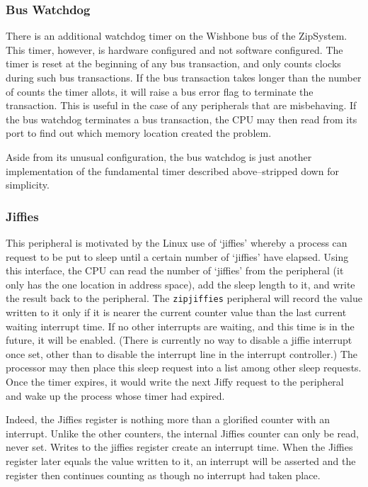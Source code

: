 \documentclass{gqtekspec}
\begin{document}
\subsubsection{Bus Watchdog}
There is an additional watchdog timer on the Wishbone bus of the ZipSystem. 
This timer,
however, is hardware configured and not software configured.  The timer is
reset at the beginning of any bus transaction, and only counts clocks during
such bus transactions.  If the bus transaction takes longer than the number
of counts the timer allots, it will raise a bus error flag to terminate the
transaction.  This is useful in the case of any peripherals that are
misbehaving.  If the bus watchdog terminates a bus transaction, the CPU may
then read from its port to find out which memory location created the problem.

Aside from its unusual configuration, the bus watchdog is just another
implementation of the fundamental timer described above--stripped down
for simplicity.
\subsubsection{Jiffies}
This peripheral is motivated by the Linux use of `jiffies' whereby a process
can request to be put to sleep until a certain number of `jiffies' have
elapsed.  Using this interface, the CPU can read the number of `jiffies'
from the peripheral (it only has the one location in address space), add the
sleep length to it, and write the result back to the peripheral.  The
{\tt zipjiffies}
peripheral will record the value written to it only if it is nearer the current
counter value than the last current waiting interrupt time.  If no other 
interrupts are waiting, and this time is in the future, it will be enabled.
(There is currently no way to disable a jiffie interrupt once set, other
than to disable the interrupt line in the interrupt controller.)  The processor
may then place this sleep request into a list among other sleep requests.
Once the timer expires, it would write the next Jiffy request to the peripheral
and wake up the process whose timer had expired.

Indeed, the Jiffies register is nothing more than a glorified counter with
an interrupt.  Unlike the other counters, the internal Jiffies counter can only
be read, never set.
Writes to the jiffies register create an interrupt time.  When the Jiffies
register later equals the value written to it, an interrupt will be asserted
and the register then continues counting as though no interrupt had taken
place.
\end{document}
